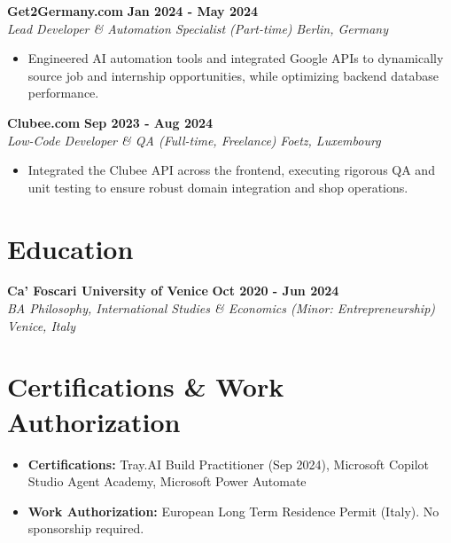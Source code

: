 \documentclass[11pt,a4paper]{article}
\begin{document}
\vspace{8pt}
\noindent \textbf{Get2Germany.com} \hfill \textbf{Jan 2024 - May 2024} \\
\textit{Lead Developer \& Automation Specialist (Part-time)} \hfill \textit{Berlin, Germany}
\begin{itemize}[leftmargin=*, noitemsep]
    \item Engineered AI automation tools and integrated Google APIs to dynamically source job and internship opportunities, while optimizing backend database performance.
\end{itemize}

\vspace{8pt}
\noindent \textbf{Clubee.com} \hfill \textbf{Sep 2023 - Aug 2024} \\
\textit{Low-Code Developer \& QA (Full-time, Freelance)} \hfill \textit{Foetz, Luxembourg}
\begin{itemize}[leftmargin=*, noitemsep]
    \item Integrated the Clubee API across the frontend, executing rigorous QA and unit testing to ensure robust domain integration and shop operations.
\end{itemize}

\section*{Education}
\noindent \textbf{Ca' Foscari University of Venice} \hfill \textbf{Oct 2020 - Jun 2024} \\
\textit{BA Philosophy, International Studies \& Economics (Minor: Entrepreneurship)} \hfill \textit{Venice, Italy}

\section*{Certifications \& Work Authorization}
\begin{itemize}[leftmargin=*, noitemsep]
    \item \textbf{Certifications:} Tray.AI Build Practitioner (Sep 2024), Microsoft Copilot Studio Agent Academy, Microsoft Power Automate
    \item \textbf{Work Authorization:} European Long Term Residence Permit (Italy). No sponsorship required.
\end{itemize}
\end{document}
